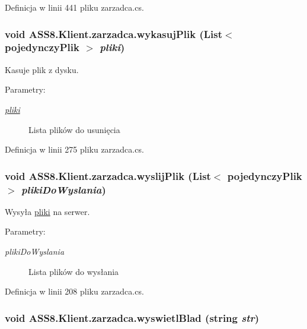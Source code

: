 Definicja w linii 441 pliku zarzadca.cs.\hypertarget{a00037_4b2c5e502366b63f4115cecdb5873ccb}{
\subsubsection[{wykasujPlik}]{\setlength{\rightskip}{0pt plus 5cm}void ASS8.Klient.zarzadca.wykasujPlik (List$<$ {\bf pojedynczyPlik} $>$ {\em pliki})}}
\label{d1/dc6/a00037_4b2c5e502366b63f4115cecdb5873ccb}


Kasuje plik z dysku. 

\begin{Desc}
\item[Parametry:]
\begin{description}
\item[{\em \hyperlink{a00017}{pliki}}]Lista plików do usunięcia\end{description}
\end{Desc}


Definicja w linii 275 pliku zarzadca.cs.\hypertarget{a00037_ecff337c51d7c6aec79286ad97745b47}{
\subsubsection[{wyslijPlik}]{\setlength{\rightskip}{0pt plus 5cm}void ASS8.Klient.zarzadca.wyslijPlik (List$<$ {\bf pojedynczyPlik} $>$ {\em plikiDoWyslania})}}
\label{d1/dc6/a00037_ecff337c51d7c6aec79286ad97745b47}


Wysyła \hyperlink{a00017}{pliki} na serwer. 

\begin{Desc}
\item[Parametry:]
\begin{description}
\item[{\em plikiDoWyslania}]Lista plików do wysłania\end{description}
\end{Desc}


Definicja w linii 208 pliku zarzadca.cs.\hypertarget{a00037_d94f9cb612f02daf94e197aae7a25c4d}{
\subsubsection[{wyswietlBlad}]{\setlength{\rightskip}{0pt plus 5cm}void ASS8.Klient.zarzadca.wyswietlBlad (string {\em str})}}
\label{d1/dc6/a00037_d94f9cb612f02daf94e197aae7a25c4d}



